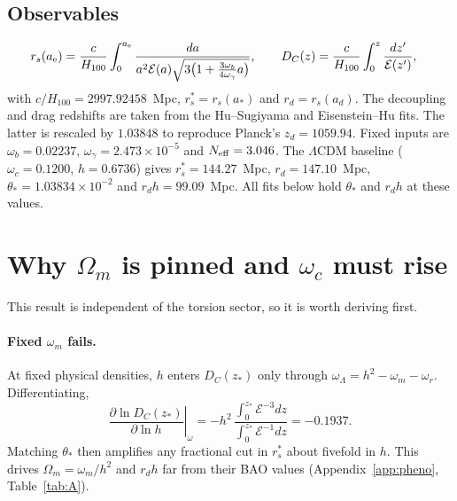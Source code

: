 \documentclass[11pt]{article}
\begin{document}
\subsection{Observables}
\begin{align}
r_s(a_{\rm e})&=\frac{c}{H_{100}}\int_0^{a_{\rm e}}
\frac{da}{a^2\mathcal{E}(a)\sqrt{3\big(1+\frac{3\omega_b}{4\omega_\gamma}a\big)}},
\qquad
D_C(z)=\frac{c}{H_{100}}\int_0^z\frac{dz'}{\mathcal{E}(z')},
\end{align}
with $c/H_{100}=2997.92458$~Mpc, $r_s^*=r_s(a_*)$ and $r_d=r_s(a_d)$. The decoupling and
drag redshifts are taken from the Hu--Sugiyama \cite{hu1996} and Eisenstein--Hu
\cite{eisenstein1998} fits. The latter is rescaled by $1.03848$ to reproduce Planck's
$z_d=1059.94$. Fixed inputs are $\omega_b=0.02237$, $\omega_\gamma=2.473\times10^{-5}$ and
$N_{\rm eff}=3.046$. The $\Lambda$CDM baseline ($\omega_c=0.1200$, $h=0.6736$) gives
$r_s^*=144.27$~Mpc, $r_d=147.10$~Mpc, $\theta_*=1.03834\times10^{-2}$ and
$r_dh=99.09$~Mpc. All fits below hold $\theta_*$ and $r_dh$ at these values.

\section{Why $\Omega_m$ is pinned and $\omega_c$ must rise}\label{sec:geometry}
This result is independent of the torsion sector, so it is worth deriving first.

\paragraph{Fixed $\omega_m$ fails.} At fixed physical densities, $h$ enters $D_C(z_*)$
only through $\omega_\Lambda=h^2-\omega_m-\omega_r$. Differentiating,
\begin{equation}
\left.\frac{\partial\ln D_C(z_*)}{\partial\ln h}\right|_{\omega}
=-h^2\,\frac{\int_0^{z_*}\mathcal{E}^{-3}dz}{\int_0^{z_*}\mathcal{E}^{-1}dz}=-0.1937 .
\end{equation}
Matching $\theta_*$ then amplifies any fractional cut in $r_s^*$ about fivefold in $h$.
This drives $\Omega_m=\omega_m/h^2$ and $r_dh$ far from their BAO values
(Appendix~\ref{app:pheno}, Table~\ref{tab:A}).
\end{document}
